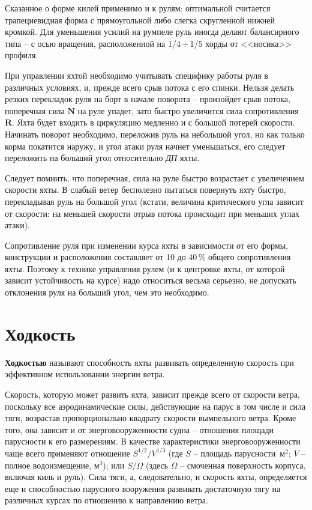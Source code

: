 \documentclass[a4paper, 12pt, twoside, final, book, russian, fittopage, cyremdash]{ncc}
\newcommand{\ve}[1]{\ensuremath{\mathbf{#1}}\xspace}
\newcommand{\otdo}{\,\ensuremath{\div}\,}
\newcommand{\msq}{~м\ensuremath{^2}\xspace}
\begin{document}
Сказанное о форме килей применимо и к рулям: оптимальной считается трапециевидная форма с прямоугольной либо слегка скругленной нижней кромкой. Для уменьшения усилий на румпеле руль иногда делают балансирного типа \--- с осью вращения, расположенной на 1/4\otdo 1/5 хорды от <<носика>> профиля.

При управлении яхтой необходимо учитывать специфику работы руля в различных условиях, и, прежде всего срыв потока с его спинки. Нельзя делать резких перекладок руля на борт в начале поворота \--- произойдет срыв потока, поперечная сила \ve N на руле упадет, зато быстро увеличится сила сопротивления \ve R. Яхта будет входить в циркуляцию медленно и с большой потерей скорости. Начинать поворот необходимо, переложив руль на небольшой угол, но как только корма покатится наружу, и угол атаки руля начнет уменьшаться, его следует переложить на больший угол относительно \textit{ДП} яхты. 

Следует помнить, что поперечная, сила на руле быстро возрастает с увеличением скорости яхты. В слабый ветер бесполезно пытаться повернуть яхту быстро, перекладывая руль на большой угол (кстати, величина критического угла зависит от скорости: на меньшей скорости отрыв потока происходит при меньших углах атаки).

Сопротивление руля при изменении курса яхты в зависимости от его формы, конструкции и расположения составляет от 10 до 40\,\% общего сопротивления яхты. Поэтому к технике управления рулем (и к центровке яхты, от которой зависит устойчивость на курсе) надо относиться весьма серьезно, не допускать отклонения руля на больший угол, чем это необходимо.

\section{Ходкость}

\textbf{Ходкостью} называют способность яхты развивать определенную скорость при эффективном использовании энергии ветра.

Скорость, которую может развить яхта, зависит прежде всего от скорости ветра, поскольку все аэродинамические силы, действующие на парус в том числе и сила тяги, возрастав пропорционально квадрату скорости вымпельного ветра. Кроме того, она зависит и от энерговооруженности судна \--- отношения площади парусности к его размерениям. В качестве характеристики энерговооруженности чаще всего применяют отношение $S^{1/2} / V^{1/3}$
(где $S$ \--- площадь парусности\msq; $V$ \--- полное водоизмещение, м$^3$); или $S / \Omega$ 
(здесь $\Omega$ \--- смоченная поверхность корпуса, включая киль и руль). Сила тяги, а, следовательно, и скорость яхты, определяется еще и способностью парусного вооружения развивать достаточную тягу на различных курсах по отношению к направлению ветра.
\end{document}
